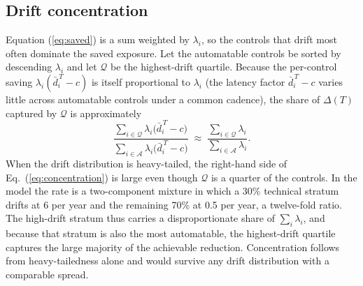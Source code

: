 \documentclass[journal]{IEEEtran}
\begin{document}
\subsection{Drift concentration}
Equation (\ref{eq:saved}) is a sum weighted by $\lambda_i$, so the controls that drift most often
dominate the saved exposure. Let the automatable controls be sorted by descending $\lambda_i$ and
let $\mathcal{Q}$ be the highest-drift quartile. Because the per-control saving $\lambda_i (\bar
d_i^{\,T} - c)$ is itself proportional to $\lambda_i$ (the latency factor $\bar d_i^{\,T} - c$
varies little across automatable controls under a common cadence), the share of $\Delta(T)$
captured by $\mathcal{Q}$ is approximately
\begin{equation}
\label{eq:concentration}
\frac{\sum_{i \in \mathcal{Q}} \lambda_i \big( \bar d_i^{\,T} - c \big)}{\sum_{i \in \mathcal{A}} \lambda_i \big( \bar d_i^{\,T} - c \big)} \;\approx\; \frac{\sum_{i \in \mathcal{Q}} \lambda_i}{\sum_{i \in \mathcal{A}} \lambda_i} .
\end{equation}
When the drift distribution is heavy-tailed, the right-hand side of Eq.~(\ref{eq:concentration})
is large even though $\mathcal{Q}$ is a quarter of the controls. In the model the rate is a
two-component mixture in which a 30\% technical stratum drifts at 6 per year and the remaining 70\%
at 0.5 per year, a twelve-fold ratio. The high-drift stratum thus carries a disproportionate share
of $\sum_i \lambda_i$, and because that stratum is also the most automatable, the highest-drift
quartile captures the large majority of the achievable reduction. Concentration follows from
heavy-tailedness alone and would survive any drift distribution with a comparable spread.
\end{document}
